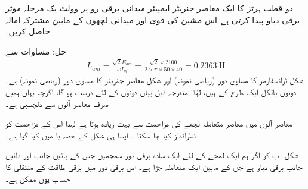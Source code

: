دو قطب  ہرٹز کا ایک معاصر جنریٹر  ایمپیئر میدانی برقی رو پر   وولٹ یک مرحلہ موثر برقی دباو پیدا کرتی ہے۔اس مشین کی قوی اور میدانی لچھوں کے مابین مشترکہ امالہ حاصل کریں۔

	حل:
	مساوات   سے 
\begin{align}
L_{am}=\frac{\sqrt{2} E_{am}}{\omega I_m}=\frac{\sqrt{2}  \times 2100}{2 \times \pi \times 50 \times 40}=\SI{0.2363}{\henry}
\end{align}
%
شکل  ٹرانسفارمر کا مساوی دور (ریاضی نمونہ) اور شکل  معاصر جنریٹر کا مساوی دور (ریاضی نمونہ) ہے۔ دونوں بالکل ایک طرح کے ہیں، لہٰذا مندرجہ ذیل بیان دونوں کے لئے درست ہو گا، اگرچہ یہاں ہمیں صرف معاصر آلوں سے دلچسپی ہے۔

معاصر آلوں میں معاصر متعاملہ لچھے کی مزاحمت سے بہت زیادہ ہوتا ہے لہٰذا اس کے مزاحمت کو نظرانداز کیا جا سکتا ۔ ایسا ہی شکل کے حصہ با میں کیا گیا ہے۔

شکل -ب کو اگر ہم ایک لمحے کے لئے ایک سادہ برقی دور سمجھیں جس کے بائیں جانب  اور دائیں جانب  برقی دباو ہے جن کے مابین ایک متعاملہ  جڑا ہے۔ اس برقی دور میں برقی طاقت کے منتقلی کا حساب یوں ممکن ہے۔

